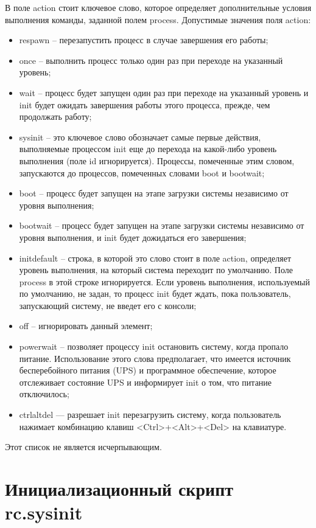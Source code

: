 В поле action стоит ключевое слово, которое определяет дополнительные условия выполнения команды, заданной полем process. Допустимые значения поля action:
\begin{itemize}
\item respawn -- перезапустить процесс в случае завершения его работы;
\item once -- выполнить процесс только один раз при переходе на указанный уровень;
\item wait -- процесс будет запущен один раз при переходе на указанный уровень и init будет ожидать завершения работы этого процесса, прежде, чем продолжать работу;
\item sysinit -- это ключевое слово обозначает самые первые действия, выполняемые процессом init еще до перехода на какой-либо уровень выполнения (поле id игнорируется). Процессы, помеченные этим словом, запускаются до процессов, помеченных словами boot и bootwait;
\item boot -- процесс будет запущен на этапе загрузки системы независимо от уровня выполнения;
\item bootwait -- процесс будет запущен на этапе загрузки системы независимо от уровня выполнения, и init будет дожидаться его завершения;
\item initdefault -- строка, в которой это слово стоит в поле action, определяет уровень выполнения, на который система переходит по умолчанию. Поле process в этой строке игнорируется. Если уровень выполнения, используемый по умолчанию, не задан, то процесс init будет ждать, пока пользователь, запускающий систему, не введет его с консоли;
\item off -- игнорировать данный элемент;
\item powerwait -- позволяет процессу init остановить систему, когда пропало питание. Использование этого слова предполагает, что имеется источник бесперебойного питания (UPS) и программное обеспечение, которое отслеживает состояние UPS и информирует init о том, что питание отключилось;
\item ctrlaltdel — разрешает init перезагрузить систему, когда пользователь нажимает комбинацию клавиш <Ctrl>+<Alt>+<Del> на клавиатуре.
\end{itemize}
Этот список не является исчерпывающим.

\newpage
\section{Инициализационный скрипт rc.sysinit}

